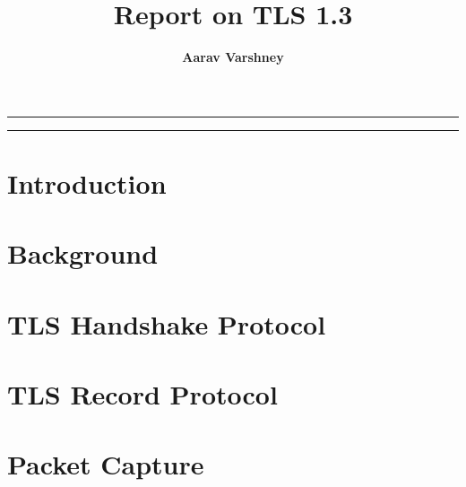 \documentclass{article}
\author[1]{\textbf{Aarav Varshney}}
\affil[1]{\textbf{Ashoka University}, \texttt{aarav.varshney@alumni.ashoka.edu.in}}
\title{\textbf{\huge Report on TLS 1.3}\\}
\date{}
\begin{document}
\pagestyle{headings}	
\newpage
\setcounter{page}{1}
\renewcommand{\thepage}{\arabic{page}}

\setlength{\parskip}{0.5em}
	
\maketitle
	
\noindent\rule{15cm}{0.5pt}
	\begin{abstract}
        
	\end{abstract}
\noindent\rule{15cm}{0.4pt}

\section{Introduction}


\section{Background}
\label{sec:background}


\section{TLS Handshake Protocol}
\label{sec:handshake}


\section{TLS Record Protocol}
\label{sec:record}

\section{Packet Capture}

% 

\newpage


\end{document}

